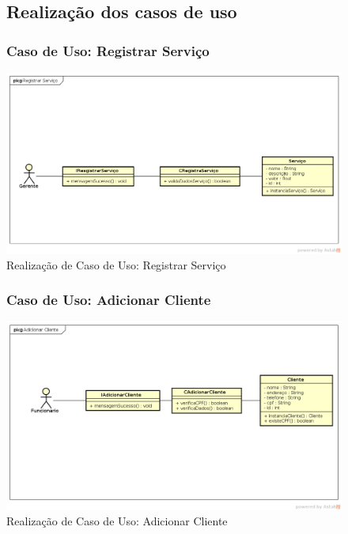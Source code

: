 \documentclass[
	12pt,				%
	openright,
	oneside,			%
	a4paper,			%
	chapter=TITLE,		%
	brazil				%
	]{abntex2}
\begin{document}
\begin{figure}[h!]

\subsection{Realização dos casos de uso}



\subsubsection*{Caso de Uso: Registrar Serviço}

	\caption{Realização de Caso de Uso: Registrar Serviço}
	\begin{center}
	    \includegraphics[scale=0.5]{Arquivos/Projeto/R_registrar_servico}  
	\end{center}
\end{figure}





\begin{figure}[h!]

\subsubsection*{Caso de Uso: Adicionar Cliente}

	\caption{Realização de Caso de Uso: Adicionar Cliente}
	\begin{center}
	    \includegraphics[scale=0.5]{Arquivos/Projeto/R_adicionar_cliente}  
	\end{center}
\end{figure}
\end{document}
